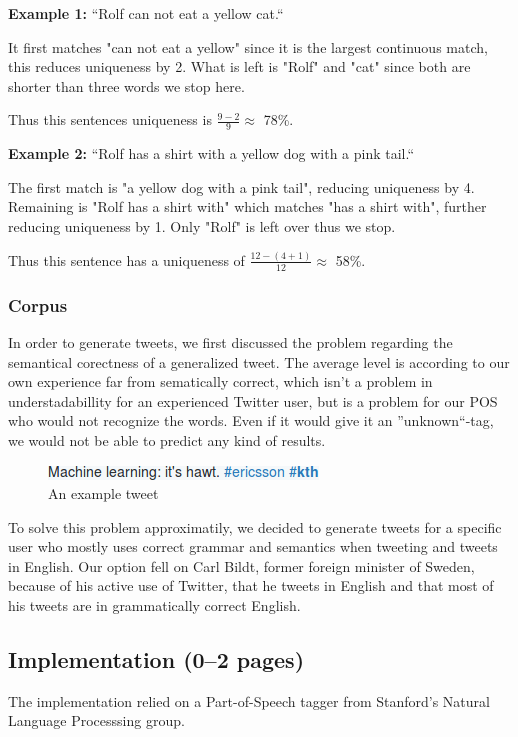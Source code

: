 \documentclass[a4paper,12pt]{article}
\begin{document}
\textbf{Example 1:} ``Rolf can not eat a yellow cat.``
	
It first matches "can not eat a yellow" since it is the largest continuous match, this reduces uniqueness by 2. What is left is "Rolf" and "cat" since both are shorter than three words we stop here.

Thus this sentences uniqueness is $\frac{9 - 2}{9} \approx$ 78\%.

\textbf{Example 2:} ``Rolf has a shirt with a yellow dog with a pink tail.``
	
The first match is "a yellow dog with a pink tail", reducing uniqueness by 4. Remaining is "Rolf has a shirt with" which matches "has a shirt with", further reducing uniqueness by 1. Only "Rolf" is left over thus we stop. 

Thus this sentence has a uniqueness of $\frac{12 - (4 + 1)}{12} \approx$ 58\%.

\subsubsection{Corpus}
In order to generate tweets, we first discussed the problem regarding the semantical corectness of a generalized tweet.
The average level is according to our own experience far from sematically correct, which isn't a problem in understadabillity for an experienced Twitter user,
but is a problem for our POS who would not recognize the words. Even if it would give it an ''unknown``-tag, we would not be able to predict any kind of results.

\begin{figure}[h!]
  \centering
  \includegraphics[width=0.75\linewidth]{machine_learning}
  \caption{An example tweet}
\end{figure}

To solve this problem approximatily, we decided to generate tweets for a specific user who mostly uses correct grammar and semantics when tweeting and tweets in English.
Our option fell on Carl Bildt, former foreign minister of Sweden, because of his active use of Twitter, 
that he tweets in English and that most of his tweets are in grammatically correct English.

\subsection{Implementation (0--2 pages)}
\label{sec:impl}
The implementation relied on a Part-of-Speech tagger from Stanford's Natural Language Processsing group.
\end{document}
